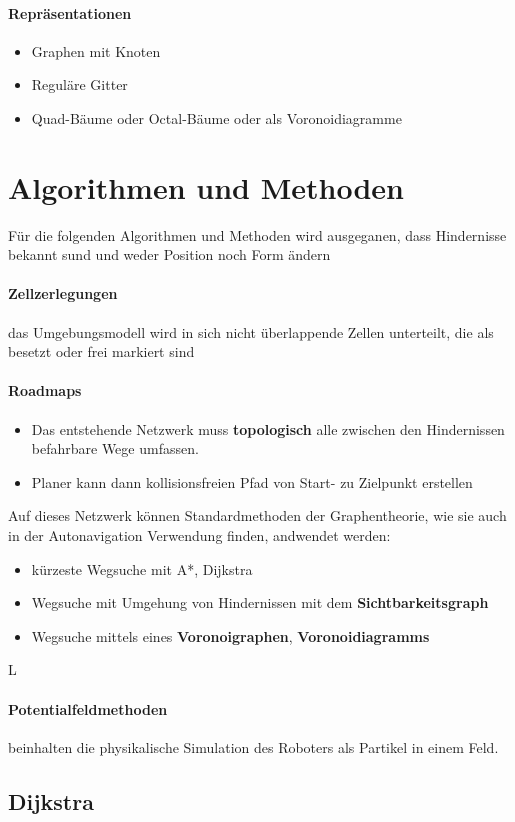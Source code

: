 \paragraph{Repräsentationen}
\begin{itemize}
	\item Graphen mit Knoten
	\item Reguläre Gitter
	\item Quad-Bäume oder Octal-Bäume oder als Voronoidiagramme
\end{itemize}
\section{Algorithmen und Methoden}
Für die folgenden Algorithmen und Methoden wird ausgeganen, dass Hindernisse bekannt sund und weder Position noch Form ändern
\paragraph{Zellzerlegungen} das Umgebungsmodell wird in sich nicht überlappende Zellen unterteilt, die als besetzt oder frei markiert sind
\paragraph{Roadmaps}
\begin{itemize}
	\item Das entstehende Netzwerk muss \textbf{topologisch} alle zwischen den Hindernissen befahrbare Wege umfassen.
	\item Planer kann dann kollisionsfreien Pfad von Start- zu Zielpunkt erstellen
\end{itemize}
Auf dieses Netzwerk können Standardmethoden der Graphentheorie, wie sie auch in der Autonavigation Verwendung finden, andwendet werden:
\begin{itemize}
	\item kürzeste Wegsuche mit A*, Dijkstra
	\item Wegsuche mit Umgehung von Hindernissen mit dem \textbf{Sichtbarkeitsgraph}
	\item Wegsuche mittels eines \textbf{Voronoigraphen}, \textbf{Voronoidiagramms}
\end{itemize}
L\paragraph{Potentialfeldmethoden} beinhalten die physikalische Simulation des Roboters als Partikel in einem Feld.
\newpage
\subsection{Dijkstra}
